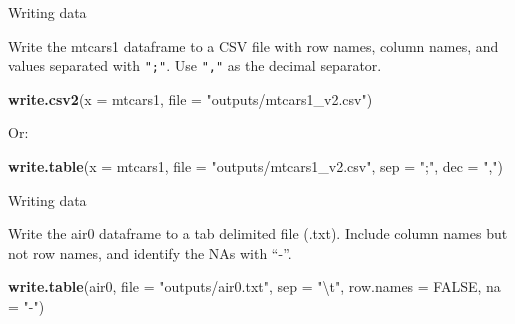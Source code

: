 \documentclass[ignorenonframetext,]{beamer}
\newenvironment{Shaded}{\begin{snugshade}}{\end{snugshade}}
\newcommand{\CharTok}[1]{\textcolor[rgb]{0.31,0.60,0.02}{#1}}
\newcommand{\DataTypeTok}[1]{\textcolor[rgb]{0.13,0.29,0.53}{#1}}
\newcommand{\KeywordTok}[1]{\textcolor[rgb]{0.13,0.29,0.53}{\textbf{#1}}}
\newcommand{\NormalTok}[1]{#1}
\newcommand{\OtherTok}[1]{\textcolor[rgb]{0.56,0.35,0.01}{#1}}
\newcommand{\StringTok}[1]{\textcolor[rgb]{0.31,0.60,0.02}{#1}}
\begin{document}
\begin{frame}[fragile]{Writing data}
\protect\hypertarget{writing-data-7}{}

Write the mtcars1 dataframe to a CSV file with row names, column names,
and values separated with \texttt{";"}. Use \texttt{","} as the decimal
separator.

\begin{Shaded}
\begin{Highlighting}[]
\KeywordTok{write.csv2}\NormalTok{(}\DataTypeTok{x =}\NormalTok{ mtcars1,}
           \DataTypeTok{file =} \StringTok{"outputs/mtcars1_v2.csv"}\NormalTok{)}
\end{Highlighting}
\end{Shaded}

Or:

\begin{Shaded}
\begin{Highlighting}[]
\KeywordTok{write.table}\NormalTok{(}\DataTypeTok{x =}\NormalTok{ mtcars1, }
            \DataTypeTok{file =} \StringTok{"outputs/mtcars1_v2.csv"}\NormalTok{, }
            \DataTypeTok{sep =} \StringTok{";"}\NormalTok{,}
            \DataTypeTok{dec =} \StringTok{","}\NormalTok{)}
\end{Highlighting}
\end{Shaded}

\end{frame}

\begin{frame}[fragile]{Writing data}
\protect\hypertarget{writing-data-8}{}

Write the air0 dataframe to a tab delimited file (.txt). Include column
names but not row names, and identify the NAs with ``-''.

\begin{Shaded}
\begin{Highlighting}[]
\KeywordTok{write.table}\NormalTok{(air0, }\DataTypeTok{file =} \StringTok{"outputs/air0.txt"}\NormalTok{, }
            \DataTypeTok{sep =} \StringTok{"}\CharTok{\textbackslash{}t}\StringTok{"}\NormalTok{,}
            \DataTypeTok{row.names =} \OtherTok{FALSE}\NormalTok{,}
            \DataTypeTok{na =} \StringTok{"-"}\NormalTok{)}
\end{Highlighting}
\end{Shaded}

\end{frame}
\end{document}
